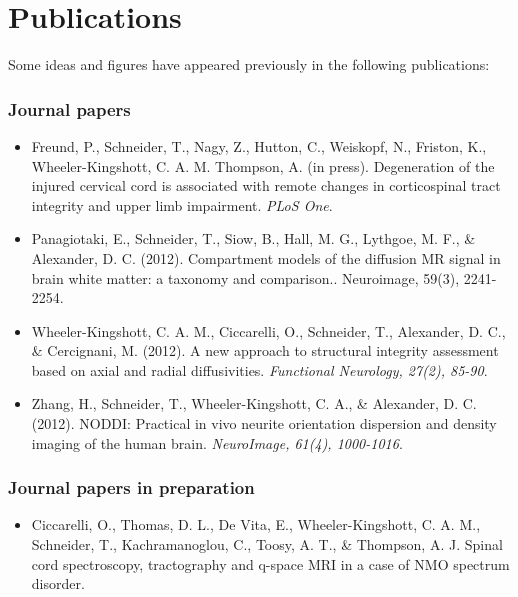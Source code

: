 

\chapter*{Publications} %

Some ideas and figures have appeared previously in the following publications:

\bigskip
\subsection*{Journal papers}
\begin{itemize}
\item Freund, P., Schneider, T., Nagy, Z., Hutton, C., Weiskopf, N., Friston, K., Wheeler-Kingshott, C. A. M. Thompson, A. (in press). Degeneration of the injured cervical cord is associated with remote changes in corticospinal tract integrity and upper limb impairment. \emph{PLoS One}.
\item Panagiotaki, E., Schneider, T., Siow, B., Hall, M. G., Lythgoe, M. F., \& Alexander, D. C. (2012). Compartment models of the diffusion MR signal in brain white matter: a taxonomy and comparison.. Neuroimage, 59(3), 2241-2254. 
\item Wheeler-Kingshott, C. A. M., Ciccarelli, O., Schneider, T., Alexander, D. C., \& Cercignani, M. (2012). A new approach to structural integrity assessment based on axial and radial diffusivities. \emph{Functional Neurology, 27(2), 85-90}.
\item Zhang, H., Schneider, T., Wheeler-Kingshott, C. A., \& Alexander, D. C. (2012). NODDI: Practical in vivo neurite orientation dispersion and density imaging of the human brain. \emph{NeuroImage, 61(4), 1000-1016}.
\end{itemize}
	
\subsection*{Journal papers in preparation}
\begin{itemize}
 \item Ciccarelli, O., Thomas, D. L., De Vita, E., Wheeler-Kingshott, C. A. M., Schneider, T., Kachramanoglou, C., Toosy, A. T., \& Thompson, A. J. Spinal cord spectroscopy, tractography and q-space MRI in a case of NMO spectrum disorder.
\end{itemize}
